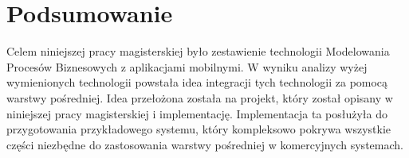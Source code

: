 \chapter{Podsumowanie }
\label{cha:podsumowanie}

Celem niniejszej pracy magisterskiej było zestawienie technologii Modelowania Procesów Biznesowych z aplikacjami mobilnymi. W wyniku analizy wyżej wymienionych technologii powstała idea integracji tych technologii za pomocą warstwy pośredniej. Idea przełożona została na projekt, który został opisany w niniejszej pracy magisterskiej i implementację. Implementacja ta posłużyła do przygotowania przykładowego systemu, który kompleksowo pokrywa wszystkie części niezbędne do zastosowania warstwy pośredniej w komercyjnych systemach. 